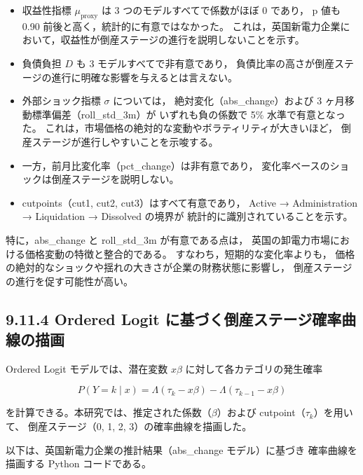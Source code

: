 \begin{itemize}
    \item 収益性指標 $\mu_{\text{proxy}}$ は 3 つのモデルすべてで係数がほぼ 0 であり，
          p 値も 0.90 前後と高く，統計的に有意ではなかった。
          これは，英国新電力企業において，収益性が倒産ステージの進行を説明しないことを示す。
    \item 負債負担 $D$ も 3 モデルすべてで非有意であり，
          負債比率の高さが倒産ステージの進行に明確な影響を与えるとは言えない。
    \item 外部ショック指標 $\sigma$ については，
          絶対変化（abs\_change）および 3 ヶ月移動標準偏差（roll\_std\_3m）が
          いずれも負の係数で 5\% 水準で有意となった。
          これは，市場価格の絶対的な変動やボラティリティが大きいほど，
          倒産ステージが進行しやすいことを示唆する。
    \item 一方，前月比変化率（pct\_change）は非有意であり，
          変化率ベースのショックは倒産ステージを説明しない。
    \item cutpoints（cut1, cut2, cut3）はすべて有意であり，
          Active → Administration → Liquidation → Dissolved の境界が
          統計的に識別されていることを示す。
\end{itemize}

特に，abs\_change と roll\_std\_3m が有意である点は，
英国の卸電力市場における価格変動の特徴と整合的である。
すなわち，短期的な変化率よりも，
価格の絶対的なショックや揺れの大きさが企業の財務状態に影響し，
倒産ステージの進行を促す可能性が高い。

\subsection*{9.11.4 Ordered Logit に基づく倒産ステージ確率曲線の描画}

Ordered Logit モデルでは、潜在変数 $x\beta$ に対して各カテゴリの発生確率



\[
P(Y=k \mid x) = \Lambda(\tau_k - x\beta) - \Lambda(\tau_{k-1} - x\beta)
\]



を計算できる。本研究では、推定された係数（$\beta$）および cutpoint（$\tau_k$）を用いて、
倒産ステージ（0, 1, 2, 3）の確率曲線を描画した。

以下は、英国新電力企業の推計結果（abs\_change モデル）に基づき
確率曲線を描画する Python コードである。


